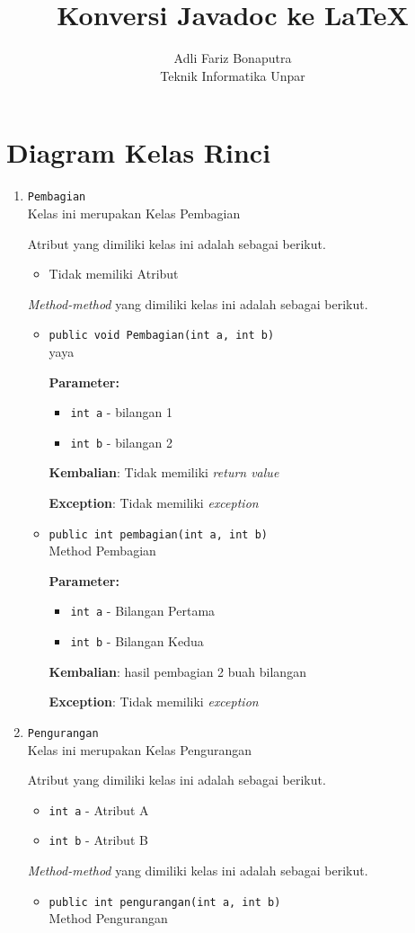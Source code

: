 \documentclass{article}
\title{\textbf{Konversi Javadoc ke \LaTeX}}
\author{Adli Fariz Bonaputra \\ Teknik Informatika Unpar}
\begin{document}
\maketitle
\section{Diagram Kelas Rinci}
\begin{enumerate}
\item \texttt{Pembagian}\\ 
Kelas ini merupakan Kelas Pembagian

Atribut yang dimiliki kelas ini adalah sebagai berikut.
\begin{itemize}
\item Tidak memiliki Atribut
\end{itemize}
\textit{Method-method} yang dimiliki kelas ini adalah sebagai berikut.
\begin{itemize}
\item \texttt{public void Pembagian(int a, int b)}\\ 
yaya

\textbf{Parameter:}
\begin{itemize}
\item \texttt{int a} - 
bilangan 1
\item \texttt{int b} - 
bilangan 2
\end{itemize}
\textbf{Kembalian}: Tidak memiliki \textit{return value}

\textbf{Exception}: Tidak memiliki \textit{exception}

\item \texttt{public int pembagian(int a, int b)}\\ 
Method Pembagian

\textbf{Parameter:}
\begin{itemize}
\item \texttt{int a} - 
Bilangan Pertama
\item \texttt{int b} - 
Bilangan Kedua
\end{itemize}
\textbf{Kembalian}: hasil pembagian 2 buah bilangan

\textbf{Exception}: Tidak memiliki \textit{exception}

\end{itemize}
\item \texttt{Pengurangan}\\ 
Kelas ini merupakan Kelas Pengurangan

Atribut yang dimiliki kelas ini adalah sebagai berikut.
\begin{itemize}
\item \texttt{int a} - Atribut A
\item \texttt{int b} - Atribut B
\end{itemize}
\textit{Method-method} yang dimiliki kelas ini adalah sebagai berikut.
\begin{itemize}
\item \texttt{public int pengurangan(int a, int b)}\\ 
Method Pengurangan


\end{itemize}
\end{enumerate}
\end{document}

